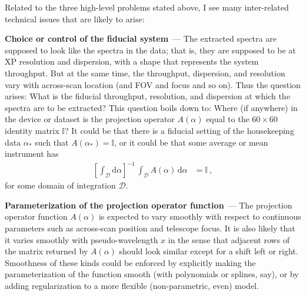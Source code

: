 \documentclass[11pt]{article}
\renewcommand{\paragraph}[1]{\medskip\par\noindent\textbf{#1}~---}
\newcommand{\dd}{\mathrm{d}}
\begin{document}
Related to the three high-level problems stated above, I see many inter-related technical issues that are likely to arise:

\paragraph{Choice or control of the fiducial system}
The extracted spectra are supposed to look like the spectra in the data; that is, they are supposed to be at XP resolution and dispersion, with a shape that represents the system throughput.
But at the same time, the throughput, dispersion, and resolution vary with across-scan location (and FOV and focus and so on).
Thus the question arises:
What is the fiducial throughput, resolution, and dispersion at which the spectra are to be extracted?
This question boils down to:
Where (if anywhere) in the device or dataset is the projection operator $A(\alpha)$ equal to the $60\times 60$ identity matrix $\mathbb{I}$?
It could be that there is a fiducial setting of the housekeeping data $\alpha_\ast$ such that $A(\alpha_\ast)=\mathbb{I}$, or it could be that some average or mean instrument has
\begin{align}
    \left[\int_\mathscr{D} \dd\alpha\right]^{-1}\,\displaystyle\int_\mathscr{D} A(\alpha)\,\dd\alpha  &= \mathbb{I} ~,\label{eq:meanA}
\end{align}
for some domain of integration $\mathscr{D}$.

\paragraph{Parameterization of the projection operator function}
The projection operator function $A(\alpha)$ is expected to vary smoothly with respect to continuous parameters such as across-scan position and telescope focus.
It is also likely that it varies smoothly with pseudo-wavelength $x$ in the sense that adjacent rows of the matrix returned by $A(\alpha)$ should look similar except for a shift left or right.
Smoothness of these kinds could be enforced by explicitly making the parameterization of the function smooth (with polynomials or splines, say), or by adding regularization to a more flexible (non-parametric, even) model.
\end{document}
